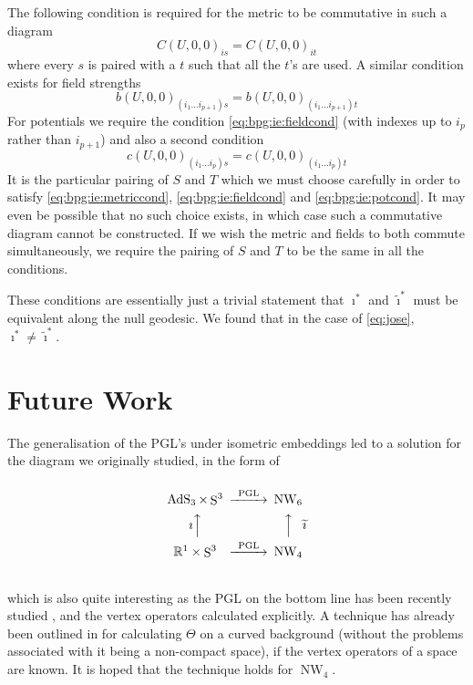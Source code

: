 \documentclass[11pt, a4paper, titlepage]{article}
\DeclareMathOperator{\AdS}{AdS}
\DeclareMathOperator{\Sphere}{S}
\DeclareMathOperator{\NW}{NW}
\let\S\Sphere
\begin{document}
The following condition is required for the metric to be commutative in such a
diagram
\begin{equation}
  \label{eq:bpg:ie:metriccond}
  C(U,0,0)_{is} = C(U,0,0)_{it}
\end{equation}
where every $s$ is paired with a $t$ such that all the $t$'s are used. A similar
condition exists for field strengths
\begin{equation}
  \label{eq:bpg:ie:fieldcond}
  b(U,0,0)_{(i_1\ldots i_{p+1})s} = b(U,0,0)_{(i_1\ldots i_{p+1})t}
\end{equation}
For potentials we require the condition \eqref{eq:bpg:ie:fieldcond} (with
indexes up to $i_p$ rather than $i_{p+1}$) and also a second condition
\begin{equation}
  \label{eq:bpg:ie:potcond}
  c(U,0,0)_{(i_1\ldots i_{p})s} = c(U,0,0)_{(i_1\ldots i_{p})t}
\end{equation}
It is the particular pairing of $S$ and $T$ which we must choose carefully in
order to satisfy \eqref{eq:bpg:ie:metriccond}, \eqref{eq:bpg:ie:fieldcond} and
\eqref{eq:bpg:ie:potcond}. It may even be possible that no such choice exists,
in which case such a commutative diagram cannot be constructed. If we wish the
metric and fields to both commute simultaneously, we require the pairing of $S$
and $T$ to be the same in all the conditions.

These conditions are essentially just a trivial statement that $\imath^*$ and
$\widetilde{\imath}^*$ must be equivalent along the null geodesic. We found that
in the case of \eqref{eq:jose}, $\imath^*\neq\widetilde{\imath}^*$.

\section{Future Work}
The generalisation of the PGL's under isometric embeddings led to a solution for
the diagram we originally studied, in the form of
\begin{equation}
  \label{eq:bpg:ex:fixed1}
  \begin{CD}
    @.\\
    \AdS_3 \times \S^3             @>\text{PGL}>> \NW_6\\
    \text{$\imath$}@AAA @AAA\text{$\widetilde{\imath}$}\\
    \mathbb{R}^1\times\S^3         @>\text{PGL}>> \NW_4\\
    @.
  \end{CD}
\end{equation}
which is also quite interesting as the PGL on the bottom line has been recently
studied \cite{kiritsis}, and the vertex operators calculated explicitly. A
technique has already been outlined in \cite{lbcb} for calculating $\Theta$ on a
curved background (without the problems associated with it being a non-compact
space), if the vertex operators of a space are known. It is hoped that the
technique holds for $\NW_4$.
\end{document}
